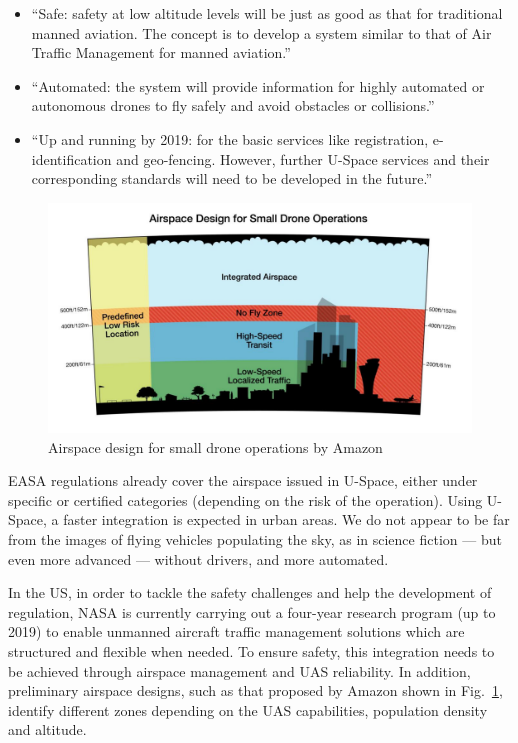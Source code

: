 \begin{itemize}
\item{``Safe: safety at low altitude levels will be just as good as that for traditional manned aviation. The concept is to develop a system similar to that of Air Traffic Management for manned aviation.''}
\item{``Automated: the system will provide information for highly automated or autonomous drones to fly safely and avoid obstacles or collisions.''}
\item{``Up and running by 2019: for the basic services like registration, e-identification and geo-fencing. However, further U-Space services and their corresponding standards will need to be developed in the future.''}
\end{itemize}


\begin{figure}
\begin{center}
\includegraphics[width=17cm]{figures/amazonDroneOperations}    %
\caption{Airspace design for small drone operations by Amazon \cite{amazonAirspace}} 
\label{fig:amazonDroneOperations}
\end{center}
\end{figure}

EASA regulations already cover the airspace issued in U-Space, either under specific or certified categories (depending on the risk of the operation). 
Using U-Space, a faster integration is expected in urban areas.
We do not appear to be far from the images of flying vehicles populating the sky, as in science fiction --- but even more advanced --- without drivers, and more automated. 

In the US, in order to tackle the safety challenges and help the development of regulation, NASA is currently carrying out a four-year research program (up to 2019) to enable unmanned aircraft traffic management solutions which are structured and flexible when needed. 
To ensure safety, this integration needs to be achieved through airspace management and UAS reliability.
In addition, preliminary airspace designs, such as that proposed by Amazon shown in Fig.~\ref{fig:amazonDroneOperations}, identify different zones depending on the UAS capabilities, population density and altitude. 


